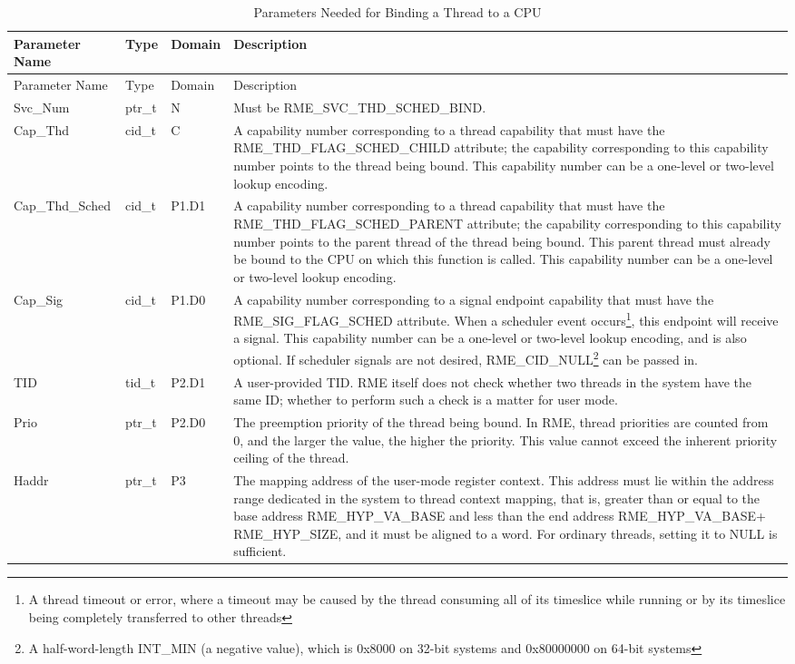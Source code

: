 \begin{xltabular}{\textwidth}{@{}>{\hsize\raggedright\arraybackslash}X>{\hsize\raggedright\arraybackslash}X>{\hsize\raggedright\arraybackslash}X>{\hsize\raggedright\arraybackslash}X@{}}
\caption{Parameters Needed for Binding a Thread to a CPU}\label{tab:4-24-bind-thread-to-cpu-parameters}\\
\toprule
Parameter Name & Type & Domain & Description\tabularnewline
\endfirsthead
\toprule
Parameter Name & Type & Domain & Description\tabularnewline
\midrule
\endhead
\bottomrule
\endlastfoot
Svc\_Num & ptr\_t & N & Must be RME\_SVC\_THD\_SCHED\_BIND.\tabularnewline
Cap\_Thd & cid\_t & C &
A capability number corresponding to a thread capability that must have the RME\_THD\_FLAG\_SCHED\_CHILD attribute; the capability corresponding to this capability number points to the thread being bound. This capability number can be a one-level or two-level lookup encoding.\tabularnewline
Cap\_Thd\_Sched & cid\_t & P1.D1 &
A capability number corresponding to a thread capability that must have the RME\_THD\_FLAG\_SCHED\_PARENT attribute; the capability corresponding to this capability number points to the parent thread of the thread being bound. This parent thread must already be bound to the CPU on which this function is called. This capability number can be a one-level or two-level lookup encoding.\tabularnewline
Cap\_Sig & cid\_t & P1.D0 &
A capability number corresponding to a signal endpoint capability that must have the RME\_SIG\_FLAG\_SCHED attribute. When a scheduler event occurs\footnote{A thread timeout or error, where a timeout may be caused by the thread consuming all of its timeslice while running or by its timeslice being completely transferred to other threads}, this endpoint will receive a signal. This capability number can be a one-level or two-level lookup encoding, and is also optional. If scheduler signals are not desired, RME\_CID\_NULL\footnote{A half-word-length INT\_MIN (a negative value), which is 0x8000 on 32-bit systems and 0x80000000 on 64-bit systems} can be passed in.\tabularnewline
TID & tid\_t & P2.D1 &
A user-provided TID. RME itself does not check whether two threads in the system have the same ID; whether to perform such a check is a matter for user mode.\tabularnewline
Prio & ptr\_t & P2.D0 &
The preemption priority of the thread being bound. In RME, thread priorities are counted from 0, and the larger the value, the higher the priority. This value cannot exceed the inherent priority ceiling of the thread.\tabularnewline
Haddr & ptr\_t & P3 &
The mapping address of the user-mode register context. This address must lie within the address range dedicated in the system to thread context mapping, that is, greater than or equal to the base address RME\_HYP\_VA\_BASE and less than the end address RME\_HYP\_VA\_BASE+
RME\_HYP\_SIZE, and it must be aligned to a word. For ordinary threads, setting it to NULL is sufficient.\tabularnewline
\end{xltabular}
\nopagebreak[4]

